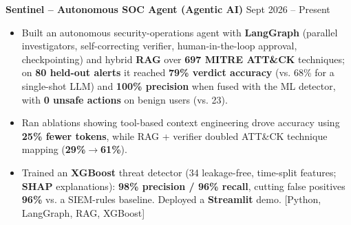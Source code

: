 \textbf{Sentinel -- Autonomous SOC Agent (Agentic AI)} \hfill Sept 2026 -- Present
\begin{itemize}[leftmargin=*,itemsep=-2pt,topsep=0pt,parsep=0pt,partopsep=0pt]
\item Built an autonomous security-operations agent with \textbf{LangGraph} (parallel investigators, self-correcting verifier, human-in-the-loop approval, checkpointing) and hybrid \textbf{RAG} over \textbf{697 MITRE ATT\&CK} techniques; on \textbf{80 held-out alerts} it reached \textbf{79\% verdict accuracy} (vs. 68\% for a single-shot LLM) and \textbf{100\% precision} when fused with the ML detector, with \textbf{0 unsafe actions} on benign users (vs. 23).
\item Ran ablations showing tool-based context engineering drove accuracy using \textbf{25\% fewer tokens}, while RAG + verifier doubled ATT\&CK technique mapping (\textbf{29\%$\rightarrow$61\%}).
\item Trained an \textbf{XGBoost} threat detector (34 leakage-free, time-split features; \textbf{SHAP} explanations): \textbf{98\% precision / 96\% recall}, cutting false positives \textbf{96\%} vs. a SIEM-rules baseline. Deployed a \textbf{Streamlit} demo. [Python, LangGraph, RAG, XGBoost]
\end{itemize}
